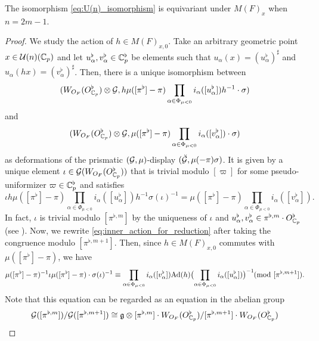 \documentclass[12pt,reqno]{amsart}
\begin{document}
\begin{prop} \label{prop:equivariance_reduction_odd}
    The isomorphism \eqref{eq:U(n)_isomorphism} is equivariant under $M(F)_x$ when $n = 2m - 1$. 
\end{prop}
\begin{proof}
    We study the action of $h \in M(F)_{x, 0}$. Take an arbitrary geometric point $x \in {\mathcal{U}}(n)(\mathbb{C}_p)$ and let $u_\alpha^\flat, v_\alpha^\flat \in \mathbb{C}_p^\flat$ be elements such that $u_\alpha(x) = (u_\alpha^\flat)^\sharp$ and $u_\alpha(hx) = (v_\alpha^\flat)^\sharp$. Then, there is a unique isomorphism between 
    \[
        (W_{O_F}(O_{\mathbb{C}_p}^\flat) \otimes {\mathcal{G}}, h \mu([\pi^\flat] - \pi) \prod_{\alpha \in \Phi_{\mu < 0}} i_\alpha([u_\alpha^\flat]) h^{-1} \cdot \sigma)
    \]
    and
    \[
        (W_{O_F}(O_{\mathbb{C}_p}^\flat) \otimes {\mathcal{G}}, \mu([\pi^\flat] - \pi) \prod_{\alpha \in \Phi_{\mu < 0}} i_\alpha([v_\alpha^\flat]) \cdot \sigma)
    \]
    as deformations of the prismatic $({\mathcal{G}}, \mu)$-display $(\breve{{\mathcal{G}}}, \mu(-\pi) \sigma)$. It is given by a unique element $\iota \in {\mathcal{G}}(W_{O_F}(O_{\mathbb{C}_p}^\flat))$ that is trivial modulo $[\varpi]$ for some pseudo-uniformizer $\varpi \in \mathbb{C}_p^\flat$ and satisfies
    \begin{equation} \label{eq:inner_action_for_reduction}
        \iota h \mu([\pi^\flat] - \pi) \prod_{\alpha \in \Phi_{\mu < 0}} i_\alpha([u_\alpha^\flat]) h^{-1} \sigma(\iota)^{-1} = \mu([\pi^\flat] - \pi) \prod_{\alpha \in \Phi_{\mu < 0}} i_\alpha([v_\alpha^\flat]). 
    \end{equation}
    In fact, $\iota$ is trivial modulo $[\pi^{\flat, m}]$ by the uniqueness of $\iota$ and $u_\alpha^\flat, v_\alpha^\flat \in \pi^{\flat, m} \cdot O_{\mathbb{C}_p}^\flat$ (see \cite[Remark 2.11]{Tak25z}). Now, we rewrite \eqref{eq:inner_action_for_reduction} after taking the congruence modulo $[\pi^{\flat, m + 1}]$. Then, since $h \in M(F)_{x, 0}$ commutes with $\mu([\pi^\flat] - \pi)$, we have 
    \begin{equation} \label{eq:inner_action_modulo_pi_flat_m+1}
        \mu([\pi^\flat] - \pi)^{-1} \iota \mu([\pi^\flat] - \pi) \cdot \sigma(\iota)^{-1} \equiv \prod_{\alpha \in \Phi_{\mu < 0}} i_\alpha([v_\alpha^\flat]) {\operatorname{Ad}}(h)\bigl(\prod_{\alpha \in \Phi_{\mu < 0}} i_\alpha([u_\alpha^\flat])\bigr)^{-1} \hspace{-5pt}\pmod{[\pi^{\flat, m + 1}]}. 
    \end{equation}
    Note that this equation can be regarded as an equation in the abelian group
    \[
        {\mathcal{G}}([\pi^{\flat, m}]) / {\mathcal{G}}([\pi^{\flat, m + 1}]) \cong {\mathfrak{g}} \otimes [\pi^{\flat, m}] \cdot W_{O_F}(O_{\mathbb{C}_p}^\flat) / [\pi^{\flat, m + 1}] \cdot W_{O_F}(O_{\mathbb{C}_p}^\flat)
\]
\end{proof}
\end{document}
